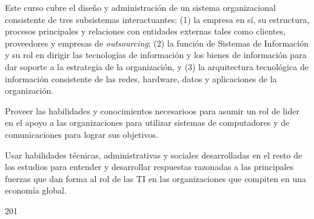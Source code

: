 \begin{syllabus}


\begin{justification}
Este curso cubre el diseño y administración de un sistema organizacional consistente de tres subsistemas interactuantes: (1) la empresa en sí, su estructura, procesos principales y relaciones con entidades externas tales como clientes, proveedores y empresas de \emph{outsourcing}; (2) la función de Sistemas de Información y su rol en dirigir las tecnologías de información y los bienes de información para dar soporte a la estrategia de la organización, y (3) la arquitectura tecnológica de información consistente de las redes, hardware, datos y aplicaciones de la organización. 
\end{justification}

\begin{goals}
\item Proveer las habilidades y conocimientos necesarioos para asumir un rol de lider en el apoyo a las organizaciones para utilizar sistemas de computadores y de comunicaciones para lograr sus objetivos. 
\item Usar habilidades técnicas, administrativas y sociales desarrolladas en el resto de los estudios para entender y desarrollar respuestas razonadas a las principales fuerzas que dan forma al rol de las TI en las organizaciones que compiten en una economía global.
\end{goals}

\begin{outcomes}
\end{outcomes}

\begin{unit}{\LUTWOONETWODef}{\LUTWOONETWOBib}{20}{1}
   \begin{topics}
   	\item \OMCONETopicTWOxONExONEOH
   	\item \OMCONEONETopicTWOxONEONExONE
   	\item \OMCONEONETopicTWOxONEONExONEFIVE
	\item \OMCONETopicTWOxONExNINE
	\begin{subtopics}
		\item \OMCONETopicTWOxONExNINExSEVEN
		\item \OMCONETopicTWOxONExNINExEIGHT
		\item \OMCONETopicTWOxONExNINExNINE
	\end{subtopics} 	
   	\item \OMCTHREETopicTWOxTHREExTHREE
   	\item \OMCTWOTopicTWOxTWOxONEOH
   \end{topics}
	\LUTWOONETWOGoal
\end{unit}


\end{syllabus}

